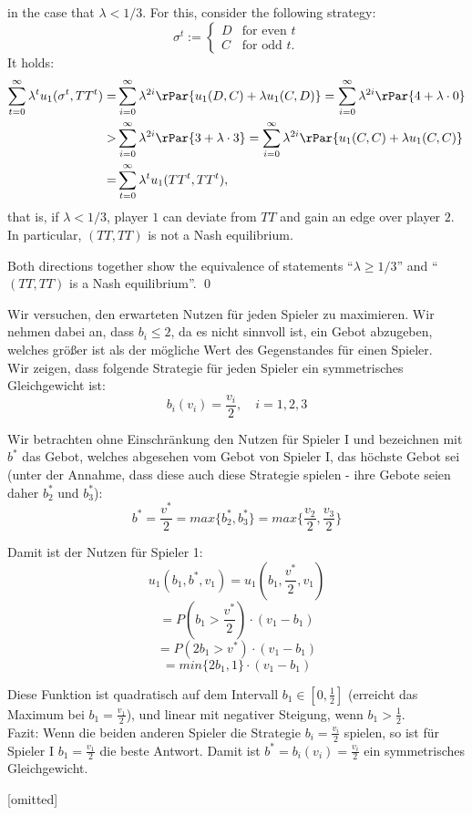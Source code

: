 \documentclass{scrartcl}
\newcommand{\exercise}[2]{\vspace{1em}\noindent{\bf Exercise #1 (#2)}}
\newcommand{\subexercise}[1]{\vspace{0.8em}\noindent{\bf #1)}}
\begin{document}
in the case that $\lambda<1/3$. For this, consider the following strategy:
\[
  \sigma^t := \begin{cases}
    D &\textrm{for even }t \\
    C &\textrm{for odd }t.
  \end{cases}
\]
It holds:
\begin{align*}
  \sum_{t=0}^\infty \lambda^t u_1(\sigma^t, TT^t)
    =& \sum_{i = 0}^\infty \lambda^{2i} \rPar{u_1(D, C) + \lambda u_1(C, D)}
    = \sum_{i = 0}^\infty \lambda^{2i} \rPar{4 + \lambda\cdot 0} \\
    >& \sum_{i = 0}^\infty \lambda^{2i} \rPar{3 + \lambda\cdot 3} 
    = \sum_{i = 0}^\infty \lambda^{2i} \rPar{u_1(C, C) + \lambda u_1(C, C)} \\
    =& \sum_{t = 0}^\infty \lambda^t u_1(TT^t, TT^t),
\end{align*}
that is, if $\lambda < 1/3$, player $1$ can deviate from $TT$ and gain an
edge over player $2$. In particular, $(TT, TT)$ is not a Nash equilibrium.

Both directions together show the equivalence of statements 
``$\lambda \geq 1/3$'' and ``$(TT, TT)$ is a Nash equilibrium''. \hfill \qed


\exercise{11.2}{Auktionen}

\subexercise{a}
Wir versuchen, den erwarteten Nutzen für jeden Spieler zu maximieren. Wir nehmen dabei an,
dass $b_i \leq 2$, da es nicht sinnvoll ist, ein Gebot abzugeben, welches größer ist als der
mögliche Wert des Gegenstandes für einen Spieler. \\

Wir zeigen, dass folgende Strategie für jeden Spieler ein symmetrisches Gleichgewicht ist: \\

\[
b_i(v_i) = \frac{v_i}{2}, \quad i = 1, 2, 3
\]

Wir betrachten ohne Einschränkung den Nutzen für Spieler I und bezeichnen mit $b^*$ das
Gebot, welches abgesehen vom Gebot von Spieler I, das höchste Gebot sei (unter der
Annahme, dass diese auch diese Strategie spielen - ihre Gebote seien daher $b^*_2$ und
$b^*_3$): \\

\[
b^* = \frac{v^*}{2}= max \{b^*_2, b^*_3\} = max \{\frac{v_2}{2}, \frac{v_3}{2}\}
\]

Damit ist der Nutzen für Spieler 1: \\

\[
u_1(b_1, b^*, v_1) = u_1(b_1, \frac{v^*}{2}, v_1)
\]
\[
= P(b_1 > \frac{v^*}{2}) \cdot (v_1 - b_1)
\]
\[
= P(2b_1 > v^*) \cdot (v_1 - b_1)
\]
\[
= min\{2b_1,1\} \cdot (v_1 - b_1)
\]

Diese Funktion ist quadratisch auf dem Intervall $b_1 \in [0, \frac{1}{2}]$ (erreicht
das Maximum bei $b_1 = \frac{v_1}{2}$), und linear mit negativer Steigung, wenn
$b_1 > \frac{1}{2}$. \\

Fazit: Wenn die beiden anderen Spieler die Strategie $b_i = \frac{v_i}{2}$ spielen,
so ist für Spieler I $b_1 = \frac{v_1}{2}$ die beste Antwort. Damit ist $b^* =
b_i(v_i) = \frac{v_i}{2}$ ein symmetrisches Gleichgewicht.

\subexercise{b} [omitted]
\end{document}
